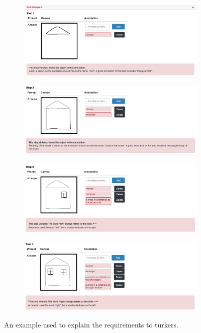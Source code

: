 \begin{figure}[!htb]
\begin{subfigure}{\textwidth}
\centering
\includegraphics[width=.8\linewidth]{data_collection/v1_badeg_1.png}  
\end{subfigure}
\newline
\begin{subfigure}{\textwidth}
\centering
\includegraphics[width=.8\linewidth]{data_collection/v1_badeg_2.png}  
\end{subfigure}
\newline
\begin{subfigure}{\textwidth}
\centering
\includegraphics[width=.8\linewidth]{data_collection/v1_badeg_3.png}  
\end{subfigure}
\newline
\begin{subfigure}{\textwidth}
\centering
\includegraphics[width=.8\linewidth]{data_collection/v1_badeg_4.png}  
\end{subfigure}
\caption{An example used to explain the requirements to turkers.}
\label{v1.badeg}
\end{figure}


